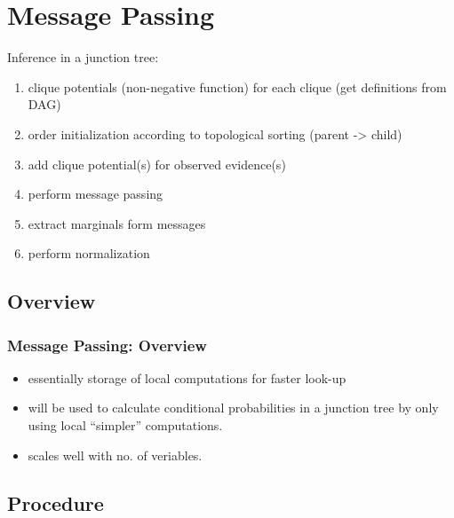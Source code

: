 \section{Message Passing}



\begin{frame}

Inference in  a junction tree:

\begin{enumerate}
\item clique potentials (non-negative function) for each clique (get definitions from DAG)
\item order initialization according to topological sorting (parent -> child)
\item add clique potential(s) for observed evidence(s)
\item perform message passing
\item extract marginals form messages
\item perform normalization
\end{enumerate}
\end{frame}

\subsection{Overview}

\begin{frame}\frametitle{Message Passing: Overview}

\begin{itemize}
\item essentially storage of local computations for faster look-up
\item will be used to calculate conditional probabilities in a junction tree by only using local ``simpler'' computations.
\item scales well with no. of veriables.
\end{itemize}

\end{frame}

\subsection{Procedure}


